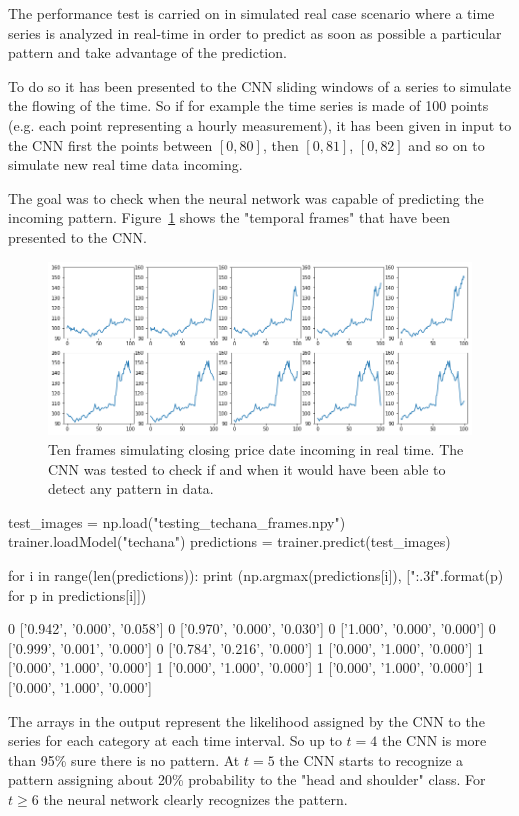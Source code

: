 The performance test is carried on in simulated real case scenario where
a time series is analyzed in real-time in order to predict as soon as
possible a particular pattern and take advantage of the prediction.

To do so it has been presented to the CNN sliding windows of a series
to simulate the flowing of the time. So if for example the time series is made
of 100 points (e.g. each point representing a hourly measurement),
it has been given in input to the CNN first the points between
\([0, 80]\), then \([0, 81]\), \([0, 82]\) and so on to simulate new real
time data incoming. 

The goal was to check when the neural network was
capable of predicting the incoming pattern. Figure~\ref{fig:frame_simulation}
shows the "temporal frames" that have been presented to the CNN.

\begin{figure}
	\centering
	\includegraphics[width=\textwidth]{figures/tech_ana_frames.png}
	\caption{Ten frames simulating closing price date incoming in real time. The CNN was tested to check if and when it would have been able to detect any pattern in data.}
	\label{fig:frame_simulation}
\end{figure}


\begin{ipython}
test_images = np.load("testing_techana_frames.npy")
trainer.loadModel("techana")
predictions = trainer.predict(test_images)

for i in range(len(predictions)):
    print (np.argmax(predictions[i]), ["{:.3f}".format(p) for p in predictions[i]])
\end{ipython}
\begin{ioutput}
0 ['0.942', '0.000', '0.058']
0 ['0.970', '0.000', '0.030']
0 ['1.000', '0.000', '0.000']
0 ['0.999', '0.001', '0.000']
0 ['0.784', '0.216', '0.000']
1 ['0.000', '1.000', '0.000']
1 ['0.000', '1.000', '0.000']
1 ['0.000', '1.000', '0.000']
1 ['0.000', '1.000', '0.000']
1 ['0.000', '1.000', '0.000']
\end{ioutput}
\noindent
The arrays in the output represent the likelihood assigned by the CNN to the series for each category
at each time interval. So up to $t=4$ the CNN is more than 95\% sure there is no pattern. 
At $t=5$ the CNN starts to recognize a pattern assigning about 20\% probability to the "head and shoulder" class.
For $t\geq 6$ the neural network clearly recognizes the pattern.
	
